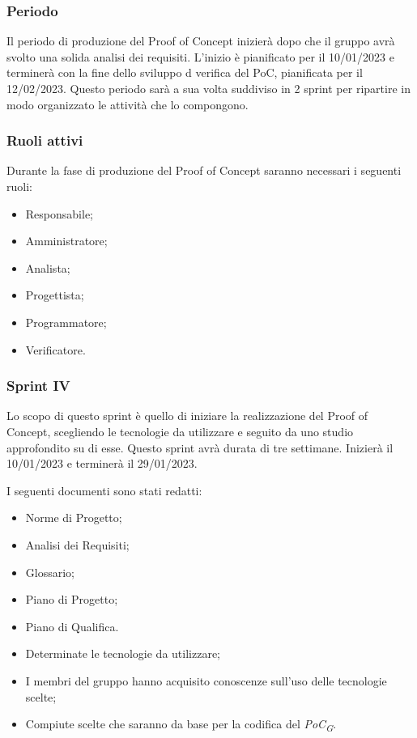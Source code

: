 \subsubsection{Periodo}
Il periodo di produzione del Proof of Concept inizierà dopo che il gruppo avrà svolto una solida analisi dei requisiti. L'inizio è pianificato per il 10/01/2023 e terminerà con la fine dello sviluppo d verifica del PoC, pianificata per il 12/02/2023. Questo periodo sarà a sua volta suddiviso in 2 sprint per ripartire in modo organizzato le attività che lo compongono.

\subsubsection{Ruoli attivi}
Durante la fase di produzione del Proof of Concept saranno necessari i seguenti ruoli:
\begin{itemize}
	\item Responsabile;
    \item Amministratore;
    \item Analista;
    \item Progettista;
    \item Programmatore;
    \item Verificatore.
\end{itemize}

\subsubsection{Sprint IV}
Lo scopo di questo sprint è quello di iniziare la realizzazione del Proof of Concept, scegliendo le tecnologie da utilizzare e seguito da uno studio approfondito su di esse.
Questo sprint avrà durata di tre settimane. Inizierà il 10/01/2023 e terminerà il 29/01/2023.

I seguenti documenti sono stati redatti:
\begin{itemize}
	\item Norme di Progetto;
	\item Analisi dei Requisiti;
	\item Glossario;
    \item Piano di Progetto;
	\item Piano di Qualifica.
\end{itemize}

\:
\begin{itemize}
	\item Determinate le tecnologie da utilizzare;
	\item I membri del gruppo hanno acquisito conoscenze sull'uso delle tecnologie scelte;
	\item Compiute scelte che saranno da base per la codifica del \textit{PoC\textsubscript{G}}.
\end{itemize}

